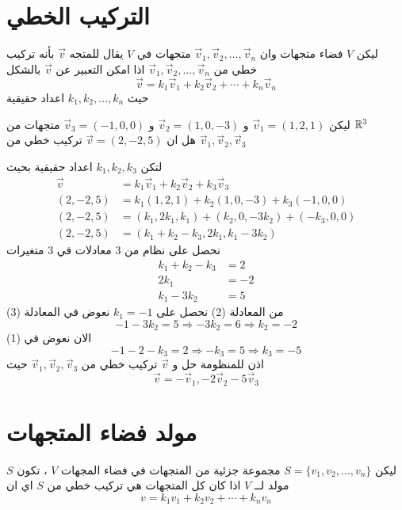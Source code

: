 	\section[التركيب الخطي]{التركيب الخطي \cite{key1}}
	ليكن $V$ فضاء متجهات وان 
	$\vec{v}_1, \vec{v}_2,\dots, \vec{v}_n$
متجهات في $V$ يقال للمتجه $\vec{v}$ بأنه تركيب خطي من $\vec{v}_1, \vec{v}_2,\dots, \vec{v}_n$ اذا امكن التعبير عن $\vec{v}$ بالشكل 
\[
	\vec{v} = k_1\vec{v}_1+k_2\vec{v}_2+\cdots +k_n\vec{v}_n
\]
حيث
$k_1, k_2, \dots, k_n$ اعداد حقيقية
\begin{example}
	ليكن $\vec{v}_1=(1,2,1)$ و $\vec{v}_2=(1,0,-3)$ و $\vec{v}_3=(-1,0,0)$ متجهات من $\mathbb{R}^3$ \\ هل  ان $\vec{v} = (2,-2,5)$ تركيب خطي من 
	$\vec{v}_1, \vec{v}_2, \vec{v}_3$
\end{example}
\begin{solution}
	لتكن $k_1, k_2, k_3$ اعداد حقيقية بحيث
	\begin{align*}
		\vec{v} &= k_1\vec{v}_1 + k_2\vec{v}_2 + k_3\vec{v}_3\\
		(2, -2, 5) &= k_1(1,2,1) + k_2(1,0,-3) + k_3 (-1, 0,0)\\
		(2, -2, 5) &= (k_1, 2k_1 , k_1) + (k_2, 0, -3k_2) + (-k_3, 0,0 )\\
		(2, -2, 5) &= (k_1+k_2-k_3, 2k_1 , k_1-3k_2)
	\end{align*}
	نحصل على نظام من 3 معادلات في 3 متغيرات
\begin{align}
	k_1 + k_2 - k_3 &= 2\\
	2k_1 & = -2\\
	k_1 -3k_2 &= 5
\end{align}
من المعادلة (2) نحصل على $k_1 = -1 $ نعوض في المعادلة (3) 
\[
-1 - 3k_2 = 5\Rightarrow -3k_2 = 6 \Rightarrow k_2 = -2
\]
الان نعوض في (1)
\[
-1 - 2 - k_3 = 2 \Rightarrow -k_3 = 5 \Rightarrow k_3 =-5
\]
اذن للمنظومة حل و $\vec{v}$ تركيب خطي من 	$\vec{v}_1, \vec{v}_2, \vec{v}_3$ حيث
\[
\vec{v} = 	-\vec{v}_1, -2\vec{v}_2 -5 \vec{v}_3
\]
\end{solution}

\section[مولد فضاء المتجهات]{مولد فضاء المتجهات \cite{key1}}
ليكن $S = \{v_1, v_2, \dots, v_n\}$ مجموعة جزئية من المتجهات في فضاء المجهات $V$ ، تكون $S$ مولد لــ $V$ اذا كان كل المتجهات هي تركيب خطي من $S$ اي ان
\[
v = k_1v_1 + k_2v_2 + \cdots + k_nv_n
\]

